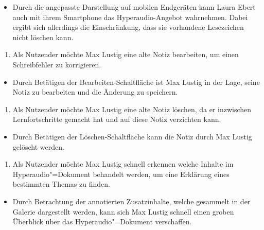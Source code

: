 \vspace{-0.1cm}
\begin{itemize}
\item[\Asterisk]
Durch die angepasste Darstellung auf mobilen Endgeräten kann Laura Ebert auch mit ihrem Smartphone das Hyperaudio-Angebot wahrnehmen. Dabei ergibt sich allerdings die Einschränkung, dass sie vorhandene Lesezeichen nicht löschen kann.
\end{itemize}
\vspace{0.25cm}
\begin{enumerate}[resume*]
\item \label{US-Notiz-Bearbeiten-Eval} Als Nutzender möchte Max Lustig eine alte Notiz bearbeiten, um einen Schreibfehler zu korrigieren.
\end{enumerate}
\vspace{-0.1cm}
\begin{itemize}
\item[\Checkmark]
Durch Betätigen der \glqq Bearbeiten\grqq{}-Schaltfläche ist Max Lustig in der Lage, seine Notiz zu bearbeiten und die Änderung zu speichern.
\end{itemize}
\vspace{0.25cm}
\begin{enumerate}[resume*]
\item \label{US-Notiz-Loeschen-Eval} Als Nutzender möchte Max Lustig eine alte Notiz löschen, da er inzwischen Lernfortschritte gemacht hat und auf diese Notiz verzichten kann.
\end{enumerate}
\vspace{-0.1cm}
\begin{itemize}
\item[\Checkmark]
Durch Betätigen der \glqq Löschen\grqq{}-Schaltfläche kann die Notiz durch Max Lustig gelöscht werden.
\end{itemize}
\vspace{0.25cm}
\begin{enumerate}[resume*]
\item \label{US-Galerie-Eval} Als Nutzender möchte Max Lustig schnell erkennen welche Inhalte im Hyperaudio"=Dokument behandelt werden, um eine Erklärung eines bestimmten Themas zu finden.
\end{enumerate}
\vspace{-0.1cm}
\begin{itemize}
\item[\Checkmark]
Durch Betrachtung der annotierten Zusatzinhalte, welche gesammelt in der Galerie dargestellt werden, kann sich Max Lustig schnell einen groben Überblick über das Hyperaudio"=Dokument verschaffen.
\end{itemize}
